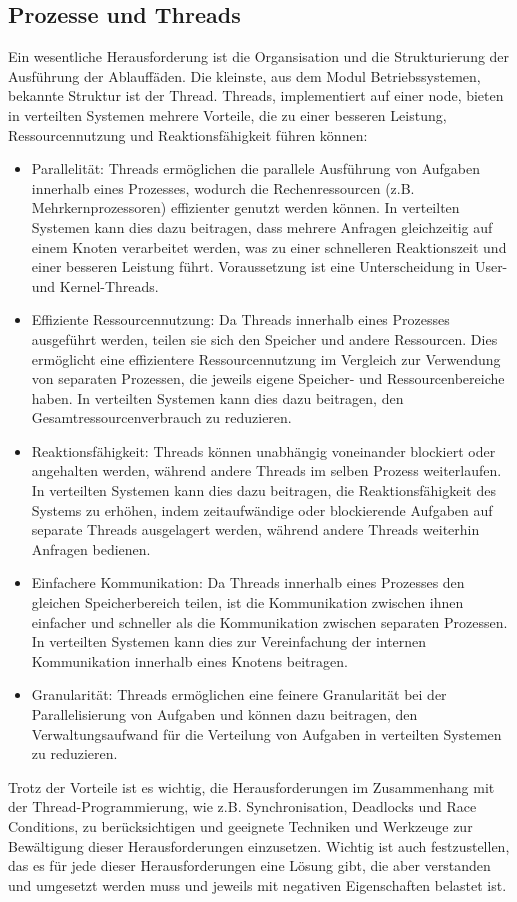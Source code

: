 \subsection{Prozesse und Threads}
Ein wesentliche Herausforderung ist die Organsisation und die Strukturierung der Ausführung der Ablauffäden. Die kleinste, aus dem Modul Betriebssystemen, bekannte Struktur ist der Thread. Threads, implementiert auf einer node, bieten in verteilten Systemen mehrere Vorteile, die zu einer besseren Leistung, Ressourcennutzung und Reaktionsfähigkeit führen können:
\begin{itemize}
\item Parallelität: Threads ermöglichen die parallele Ausführung von Aufgaben innerhalb eines Prozesses, wodurch die Rechenressourcen (z.B. Mehrkernprozessoren) effizienter genutzt werden können. In verteilten Systemen kann dies dazu beitragen, dass mehrere Anfragen gleichzeitig auf einem Knoten verarbeitet werden, was zu einer schnelleren Reaktionszeit und einer besseren Leistung führt. Voraussetzung ist eine Unterscheidung in User- und Kernel-Threads.
\item Effiziente Ressourcennutzung: Da Threads innerhalb eines Prozesses ausgeführt werden, teilen sie sich den Speicher und andere Ressourcen. Dies ermöglicht eine effizientere Ressourcennutzung im Vergleich zur Verwendung von separaten Prozessen, die jeweils eigene Speicher- und Ressourcenbereiche haben. In verteilten Systemen kann dies dazu beitragen, den Gesamtressourcenverbrauch zu reduzieren.
\item Reaktionsfähigkeit: Threads können unabhängig voneinander blockiert oder angehalten werden, während andere Threads im selben Prozess weiterlaufen. In verteilten Systemen kann dies dazu beitragen, die Reaktionsfähigkeit des Systems zu erhöhen, indem zeitaufwändige oder blockierende Aufgaben auf separate Threads ausgelagert werden, während andere Threads weiterhin Anfragen bedienen.
\item Einfachere Kommunikation: Da Threads innerhalb eines Prozesses den gleichen Speicherbereich teilen, ist die Kommunikation zwischen ihnen einfacher und schneller als die Kommunikation zwischen separaten Prozessen. In verteilten Systemen kann dies zur Vereinfachung der internen Kommunikation innerhalb eines Knotens beitragen.
\item Granularität: Threads ermöglichen eine feinere Granularität bei der Parallelisierung von Aufgaben und können dazu beitragen, den Verwaltungsaufwand für die Verteilung von Aufgaben in verteilten Systemen zu reduzieren.
\end{itemize}
Trotz der Vorteile ist es wichtig, die Herausforderungen im Zusammenhang mit der Thread-Programmierung, wie z.B. Synchronisation, Deadlocks und Race Conditions, zu berücksichtigen und geeignete Techniken und Werkzeuge zur Bewältigung dieser Herausforderungen einzusetzen. Wichtig ist auch festzustellen, das es für jede dieser Herausforderungen eine Lösung gibt, die aber verstanden und umgesetzt werden muss und jeweils mit negativen Eigenschaften belastet ist. 

